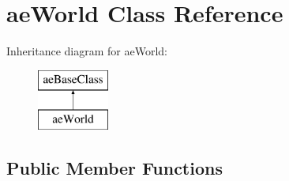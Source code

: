 \hypertarget{classae_world}{}\section{ae\+World Class Reference}
\label{classae_world}
Inheritance diagram for ae\+World\+:\begin{figure}[H]
\begin{center}
\leavevmode
\includegraphics[height=2.000000cm]{classae_world}
\end{center}
\end{figure}
\subsection*{Public Member Functions}
